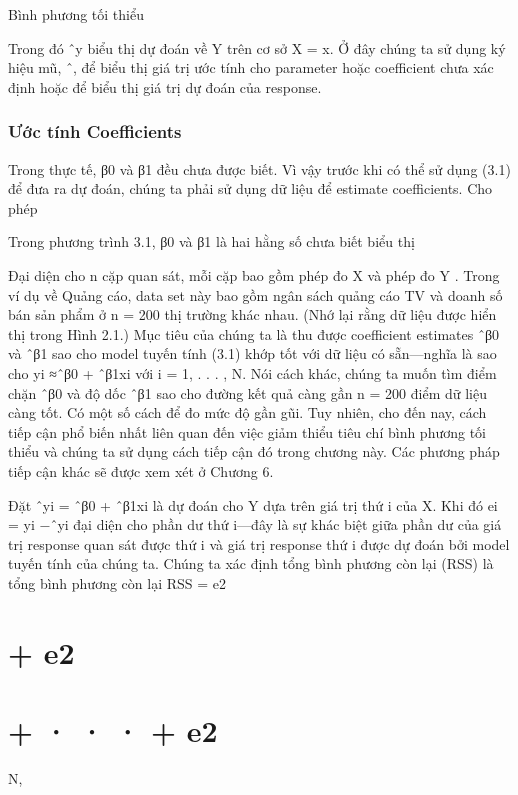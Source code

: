 Bình phương tối thiểu

Trong đó ˆy biểu thị dự đoán về Y trên cơ sở X = x. Ở đây chúng ta sử dụng ký hiệu mũ, ˆ, để biểu thị giá trị ước tính cho parameter hoặc coefficient chưa xác định hoặc để biểu thị giá trị dự đoán của response.

\subsubsection{Ước tính Coefficients}

Trong thực tế, β0 và β1 đều chưa được biết. Vì vậy trước khi có thể sử dụng (3.1) để đưa ra dự đoán, chúng ta phải sử dụng dữ liệu để estimate coefficients. Cho phép

Trong phương trình 3.1, β0 và β1 là hai hằng số chưa biết biểu thị

Đại diện cho n cặp quan sát, mỗi cặp bao gồm phép đo X và phép đo Y . Trong ví dụ về Quảng cáo, data set này bao gồm ngân sách quảng cáo TV và doanh số bán sản phẩm ở n = 200 thị trường khác nhau. (Nhớ lại rằng dữ liệu được hiển thị trong Hình 2.1.) Mục tiêu của chúng ta là thu được coefficient estimates ˆβ0 và ˆβ1 sao cho model tuyến tính (3.1) khớp tốt với dữ liệu có sẵn—nghĩa là sao cho yi ≈ˆβ0 + ˆβ1xi với i = 1, . . . , N. Nói cách khác, chúng ta muốn tìm điểm chặn ˆβ0 và độ dốc ˆβ1 sao cho đường kết quả càng gần n = 200 điểm dữ liệu càng tốt. Có một số cách để đo mức độ gần gũi. Tuy nhiên, cho đến nay, cách tiếp cận phổ biến nhất liên quan đến việc giảm thiểu tiêu chí bình phương tối thiểu và chúng ta sử dụng cách tiếp cận đó trong chương này. Các phương pháp tiếp cận khác sẽ được xem xét ở Chương 6.

Đặt ˆyi = ˆβ0 + ˆβ1xi là dự đoán cho Y dựa trên giá trị thứ i của X. Khi đó ei = yi −ˆyi đại diện cho phần dư thứ i—đây là sự khác biệt giữa phần dư của giá trị response quan sát được thứ i và giá trị response thứ i được dự đoán bởi model tuyến tính của chúng ta. Chúng ta xác định tổng bình phương còn lại (RSS) là tổng bình phương còn lại RSS = e2

\section{+ e2}

\section{+ · · · + e2}

N,

